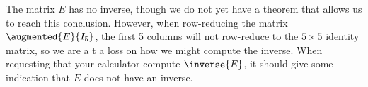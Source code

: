 The matrix $E$ has no inverse, though we do not yet have a theorem that allows us to reach this conclusion.  However, when row-reducing the matrix $\augmented{E}{I_5}$, the first 5 columns will not row-reduce to the $5\times 5$ identity matrix, so we are a t a loss on how we might compute the inverse.  When requesting that your calculator compute $\inverse{E}$, it should give some indication that $E$ does not have an inverse.